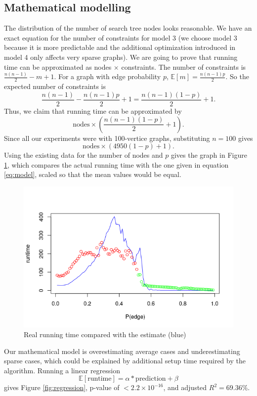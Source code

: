 \documentclass{article}
\theoremstyle{definition}
\begin{document}
\subsection{Mathematical modelling}
The distribution of the number of search tree nodes looks reasonable. We have an exact equation for the number of constraints for model 3 (we choose model 3 because it is more predictable and the additional optimization introduced in model 4 only affects very sparse graphs). We are going to prove that running time can be approximated as nodes $\times$ constraints. The number of constraints is $\frac{n(n-1)}{2}-m+1$. For a graph with edge probability $p$, $\mathbb{E}[m] = \frac{n(n-1)p}{2}$. So the expected number of constraints is
\[ \frac{n(n-1)}{2}-\frac{n(n-1)p}{2}+1=\frac{n(n-1)(1-p)}{2}+1. \]
Thus, we claim that running time can be approximated by
\[ \text{nodes}\times \left( \frac{n(n-1)(1-p)}{2} + 1 \right). \]
Since all our experiments were with 100-vertice graphs, substituting $n=100$ gives
\begin{equation}
  \text{nodes} \times (4950(1-p)+1).
  \label{eq:model}
\end{equation}
Using the existing data for the number of nodes and $p$ gives the graph in Figure \ref{fig:model}, which compares the actual running time with the one given in equation \ref{eq:model}, scaled so that the mean values would be equal.
\begin{figure}
  \includegraphics[scale=0.5]{model.png}
  \caption{Real running time compared with the estimate (blue)}
  \label{fig:model}
\end{figure}
Our mathematical model is overestimating average cases and underestimating sparse cases, which could be explained by additional setup time required by the algorithm. Running a linear regression
\[ \mathbb{E}[\text{runtime}] = \alpha * \text{prediction} + \beta \]
gives Figure \ref{fig:regression}, p-value of $ < 2.2\times 10^{-16}$, and adjusted $R^2 = 69.36\%$.
\end{document}
